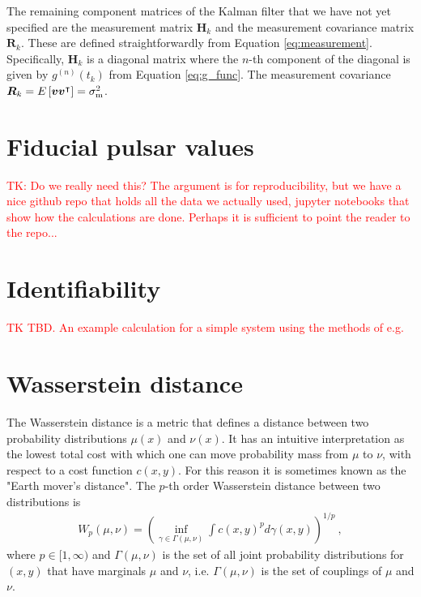 \documentclass[fleqn,usenatbib,useAMS]{mnras}
\begin{document}
The remaining component matrices of the Kalman filter that we have not yet specified are the measurement matrix $\boldsymbol{H}_k$ and the measurement covariance matrix $\boldsymbol{R}_k$. These are defined straightforwardly from Equation \eqref{eq:measurement}. Specifically, 
$\boldsymbol{H}_k$ is a diagonal matrix where the $n$-th component of the diagonal is given by $g^{(n)}(t_k)$ from Equation \eqref{eq:g_func}. The measurement covariance $\boldsymbol{R}_k = E \left[ \boldsymbol{v} \boldsymbol{v}^\intercal \right] = \sigma^2_{\rm m}$.



\section{Fiducial pulsar values}\label{appendix_fiducial}
\textcolor{red}{TK: Do we really need this? The argument is for reproducibility, but we have a nice github repo that holds all the data we actually used, jupyter notebooks that show how the calculations are done. Perhaps it is sufficient to point the reader to the repo... } 
\section{Identifiability}\label{appendix_identifiability}
\textcolor{red}{TK TBD. An example calculation for a simple system using the methods of e.g. } \citep{KARLSSON2012941} \citep{SEDOGLAVIC2002735}



\section{Wasserstein distance}\label{sec:wasserstein}
The Wasserstein distance is a metric that defines a distance between two probability distributions $\mu(x)$ and $\nu(x)$. It has an intuitive interpretation as the lowest total cost with which one can move probability mass from $\mu$ to $\nu$, with respect to a cost function $c(x,y)$. For this reason it is sometimes known as the "Earth mover's distance". The $p$-th order Wasserstein distance between two distributions is
\begin{eqnarray}
	W_p(\mu,\nu)= \left( \inf_{\gamma \in \Gamma(\mu, \nu)}  \int c(x,y)^p d \gamma (x,y)\right)^{1/p} \label{eq:wasserstein} \ ,
\end{eqnarray}
where $p \in [1,\infty)$ and $\Gamma(\mu, \nu)$ is the set of all joint probability distributions for $(x,y)$ that have marginals $\mu$ and $\nu$, i.e. $\Gamma(\mu, \nu)$ is the set of couplings of $\mu$ and $\nu$. \newline 
\end{document}
